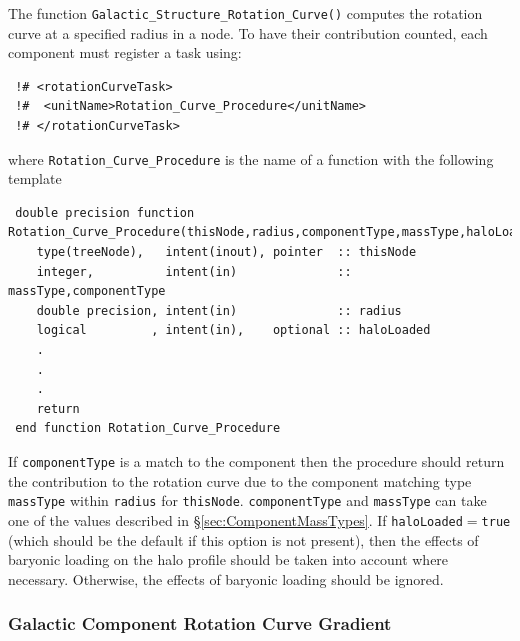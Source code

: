 The function {\tt Galactic\_Structure\_Rotation\_Curve()} computes the rotation curve at a specified radius in a node. To have their contribution counted, each component must register a task using:
\begin{verbatim}
 !# <rotationCurveTask>
 !#  <unitName>Rotation_Curve_Procedure</unitName>
 !# </rotationCurveTask>
\end{verbatim}
where {\tt Rotation\_Curve\_Procedure} is the name of a function with the following template
\begin{verbatim}
 double precision function Rotation_Curve_Procedure(thisNode,radius,componentType,massType,haloLoaded)
    type(treeNode),   intent(inout), pointer  :: thisNode
    integer,          intent(in)              :: massType,componentType
    double precision, intent(in)              :: radius
    logical         , intent(in),    optional :: haloLoaded
    .
    .
    .
    return
 end function Rotation_Curve_Procedure
\end{verbatim}
If {\tt componentType} is a match to the component then the procedure should return the contribution to the rotation curve due to the component matching type {\tt massType} within {\tt radius} for {\tt thisNode}. {\tt componentType} and {\tt massType} can take one of the values described in \S\ref{sec:ComponentMassTypes}. If {\tt haloLoaded}$=${\tt true} (which should be the default if this option is not present), then the effects of baryonic loading on the halo profile should be taken into account where necessary. Otherwise, the effects of baryonic loading should be ignored.

\subsubsection{Galactic Component Rotation Curve Gradient}

